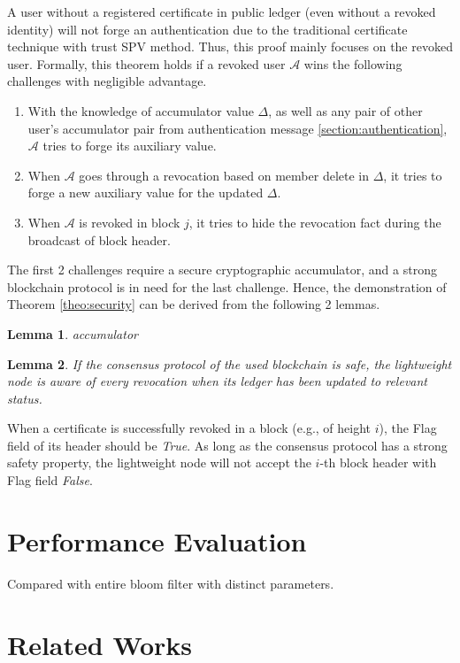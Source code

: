 \documentclass[conference]{IEEEtran}
\newtheorem{lemma}{Lemma}[theorem]
\begin{document}
\begin{IEEEproof}
    A user without a registered certificate in public ledger (even without a revoked identity) will not forge an authentication due to the traditional certificate technique with trust SPV method. Thus, this proof mainly focuses on the revoked user. Formally, this theorem holds if a revoked user $\mathcal{A}$ wins the following challenges with negligible advantage.
    \begin{enumerate}
        \item With the knowledge of accumulator value $\Delta$, as well as any pair of other user's accumulator pair from authentication message \ref{section:authentication}, $\mathcal{A}$ tries to forge its auxiliary value.
        \item When $\mathcal{A}$ goes through a revocation based on member delete in $\Delta$, it tries to forge a new auxiliary value for the updated $\Delta$.
        \item When $\mathcal{A}$ is revoked in block $j$, it tries to hide the revocation fact during the broadcast of block header.
    \end{enumerate}

    The first 2 challenges require a secure cryptographic accumulator, and a strong blockchain protocol is in need for the last challenge. Hence, the demonstration of Theorem \ref{theo:security} can be derived from the following 2 lemmas.
\end{IEEEproof}
\begin{lemma}
    accumulator
\end{lemma}

\begin{lemma}
    If the consensus protocol of the used blockchain is safe, the lightweight node is aware of every revocation when its ledger has been updated to relevant status.
\end{lemma}

\begin{IEEEproof}
When a certificate is successfully revoked in a block (e.g., of height $i$), the Flag field of its header should be \textit{True}. As long as the consensus protocol has a strong safety property, the lightweight node will not accept the $i$-th block header with Flag field \textit{False}. 
\end{IEEEproof}

\section{Performance Evaluation}

Compared with entire bloom filter with distinct parameters.

\section{Related Works}




\end{document}
